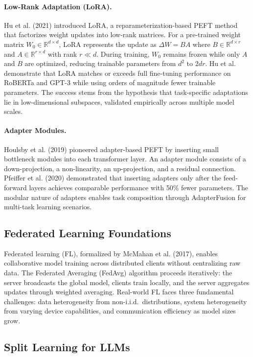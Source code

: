 \documentclass[11pt,a4paper]{article}
\begin{document}
\paragraph{Low-Rank Adaptation (LoRA).}
Hu et al. (2021) introduced LoRA, a reparameterization-based PEFT method that factorizes weight updates into low-rank matrices. For a pre-trained weight matrix $W_0 \in \mathbb{R}^{d\times d}$, LoRA represents the update as $\Delta W = BA$ where $B \in \mathbb{R}^{d\times r}$ and $A \in \mathbb{R}^{r\times d}$ with rank $r \ll d$. During training, $W_0$ remains frozen while only $A$ and $B$ are optimized, reducing trainable parameters from $d^2$ to $2dr$. Hu et al. demonstrate that LoRA matches or exceeds full fine-tuning performance on RoBERTa and GPT-3 while using orders of magnitude fewer trainable parameters. The success stems from the hypothesis that task-specific adaptations lie in low-dimensional subspaces, validated empirically across multiple model scales.

\paragraph{Adapter Modules.}
Houlsby et al. (2019) pioneered adapter-based PEFT by inserting small bottleneck modules into each transformer layer. An adapter module consists of a down-projection, a non-linearity, an up-projection, and a residual connection. Pfeiffer et al. (2020) demonstrated that inserting adapters only after the feed-forward layers achieves comparable performance with 50\% fewer parameters. The modular nature of adapters enables task composition through AdapterFusion for multi-task learning scenarios.

\subsection{Federated Learning Foundations}

Federated learning (FL), formalized by McMahan et al. (2017), enables collaborative model training across distributed clients without centralizing raw data. The Federated Averaging (FedAvg) algorithm proceeds iteratively: the server broadcasts the global model, clients train locally, and the server aggregates updates through weighted averaging. Real-world FL faces three fundamental challenges: data heterogeneity from non-i.i.d.\ distributions, system heterogeneity from varying device capabilities, and communication efficiency as model sizes grow.

\subsection{Split Learning for LLMs}
\end{document}
